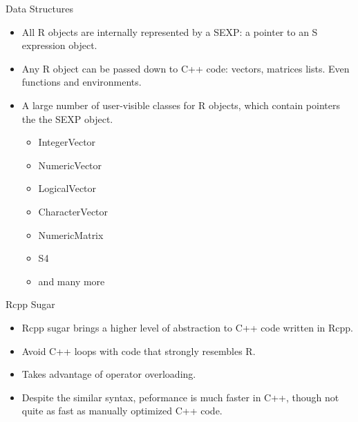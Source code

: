 \documentclass{beamer}\usepackage[]{graphicx}\usepackage[]{color}
\begin{document}
\begin{frame}[fragile]{Data Structures}
    \vspace{0.5em}
    \begin{itemize}\itemsep1em
        \item All R objects are internally represented by a SEXP: a pointer
            to an S expression object.
        \item Any R object can be passed down to C++ code: vectors, matrices
            lists. Even functions and environments.
        \item A large number of user-visible classes for R objects, which
            contain pointers the the SEXP object.
            \begin{itemize}
                \item IntegerVector
                \item NumericVector
                \item LogicalVector
                \item CharacterVector
                \item NumericMatrix
                \item S4
                \item and many more
            \end{itemize}
    \end{itemize}
\end{frame}
\begin{frame}[fragile]{Rcpp Sugar}
    \vspace{0.5em}
    \begin{itemize}\itemsep1em
        \item Rcpp sugar brings a higher level of abstraction to C++ code
            written in Rcpp.
        \item Avoid C++ loops with code that strongly resembles R.
        \item Takes advantage of operator overloading.
        \item Despite the similar syntax, peformance is much faster in C++,
            though not quite as fast as manually optimized C++ code.
    \end{itemize}
\end{frame}
\end{document}
